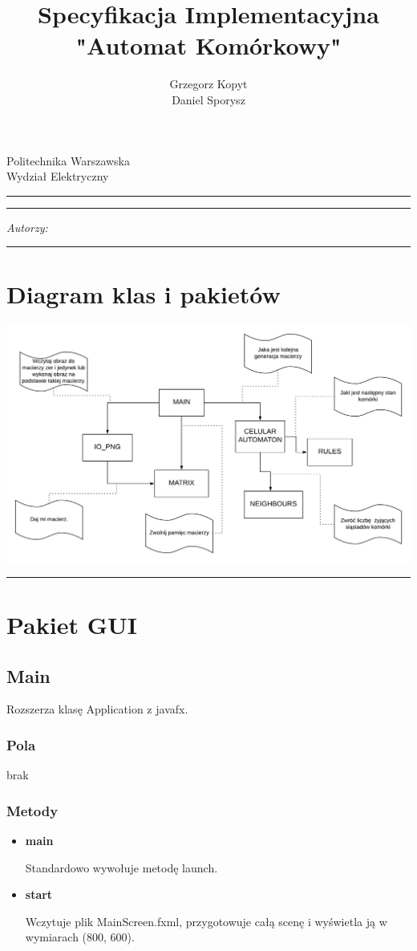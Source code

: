 \documentclass[a4paper,11pt]{article}
\author{Grzegorz Kopyt\\
Daniel Sporysz}
\title{Specyfikacja Implementacyjna \\
"Automat Komórkowy"}
\makeatletter
\newcommand{\linia}{\rule{\linewidth}{0.4mm}}
\renewcommand{\maketitle}{\begin{titlepage}
    \vspace*{2cm}
    \begin{center}\LARGE
    Politechnika Warszawska\\
    Wydział Elektryczny\\
    \end{center}
    \vspace{5cm}
    \noindent\linia
    \begin{center}
      \LARGE \textsc{\@title}
         \end{center}
     \linia
    \vspace{0.5cm}
    \begin{flushright}
    \begin{minipage}{5cm}
    \textit{Autorzy:}\\
    \normalsize \textsc{\@author} \par
    \end{minipage}
    \vspace{5cm}
     \end{flushright}
    \vspace*{\stretch{6}}
    \begin{center}
    \@date
    \end{center}
  \end{titlepage}%
}
\makeatother
\begin{document}
\maketitle


\tableofcontents
\vspace{1cm}
\noindent\linia





\section{Diagram klas i pakietów}


\includegraphics[width=\textwidth]{Automat2}






\noindent\linia
\section{Pakiet GUI}



\subsection{Main}
Rozszerza klasę Application z javafx.
\subsubsection{Pola}
brak
\subsubsection{Metody}
\begin{itemize}
\item \textbf{main}

Standardowo wywołuje metodę launch.
\item \textbf{start}

Wczytuje plik MainScreen.fxml, przygotowuje całą scenę i wyświetla ją w wymiarach (800, 600).
\end{itemize}
\end{document}

